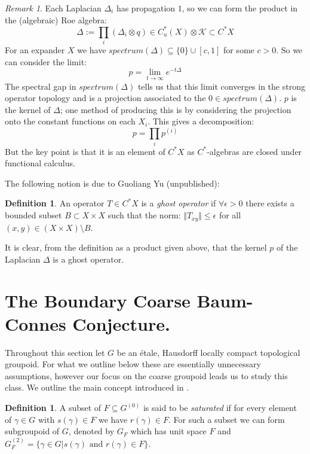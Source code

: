 \documentclass[11pt]{amsart}
\theoremstyle{plain}
\theoremstyle{definition}%
\newtheorem{definition}[theorem]{Definition}%
\theoremstyle{remark}%
\newtheorem{remark}[theorem]{Remark}%
\begin{document}
\begin{remark}\label{Rem:Ghost}
Each Laplacian $\Delta_{i}$ has propagation $1$, so we can form the product in the (algebraic) Roe algebra:
\begin{equation*}
\Delta:=\prod_{i}(\Delta_{i} \otimes q) \in C^{*}_{u}(X)\otimes \mathcal{K} \subset C^{*}X
\end{equation*}
For an expander $X$ we have $spectrum(\Delta) \subseteq \lbrace 0 \rbrace \cup [c,1]$ for some $c>0$. So we can consider the limit:
\begin{equation*}
p = \lim_{t \rightarrow \infty}e^{-t\Delta}
\end{equation*}
The spectral gap in $spectrum(\Delta)$ tells us that this limit converges in the strong operator topology and is a projection associated to the $0 \in spectrum(\Delta)$. $p$ is the kernel of $\Delta$; one method of producing this is by considering the projection onto the constant functions on each $X_{i}$. This gives a decomposition:
\begin{equation*}
p=\prod_{i}p^{(i)}
\end{equation*}
But the key point is that it is an element of $C^{*}X$ as $C^{*}$-algebras are closed under functional calculus.
\end{remark}
The following notion is due to Guoliang Yu (unpublished):

\begin{definition}\label{Def:Ghost}
An operator $T \in C^{*}X$ is a \textit{ghost operator} if $\forall \epsilon >0$ there exists a bounded subset $B \subset X\times X$ such that the norm: $\Vert T_{xy} \Vert \leq \epsilon$ for all $(x,y) \in (X\times X) \setminus B$.
\end{definition}

It is clear, from the definition as a product given above, that the kernel $p$ of the Laplacian $\Delta$ is a ghost operator.

\section{The Boundary Coarse Baum-Connes Conjecture.}\label{Sect:CE}

Throughout this section let $G$ be an \'etale, Hausdorff locally compact topological groupoid. For what we outline below these are essentially unnecessary assumptions, however our focus on the coarse groupoid leads us to study this class. We outline the main concept introduced in \cite{MR1911663}. 

\begin{definition}
A subset of $F\subseteq G^{(0)}$ is said to be \textit{saturated} if for every element of $\gamma \in G$ with $s(\gamma) \in F$ we have $r(\gamma) \in F$. For such a subset we can form subgroupoid of $G$, denoted by $G_{F}$ which has unit space $F$ and $G_{F}^{(2)}=\lbrace \gamma \in G | s(\gamma) \mbox{ and } r(\gamma) \in F \rbrace$.
\end{definition}
\end{document}
